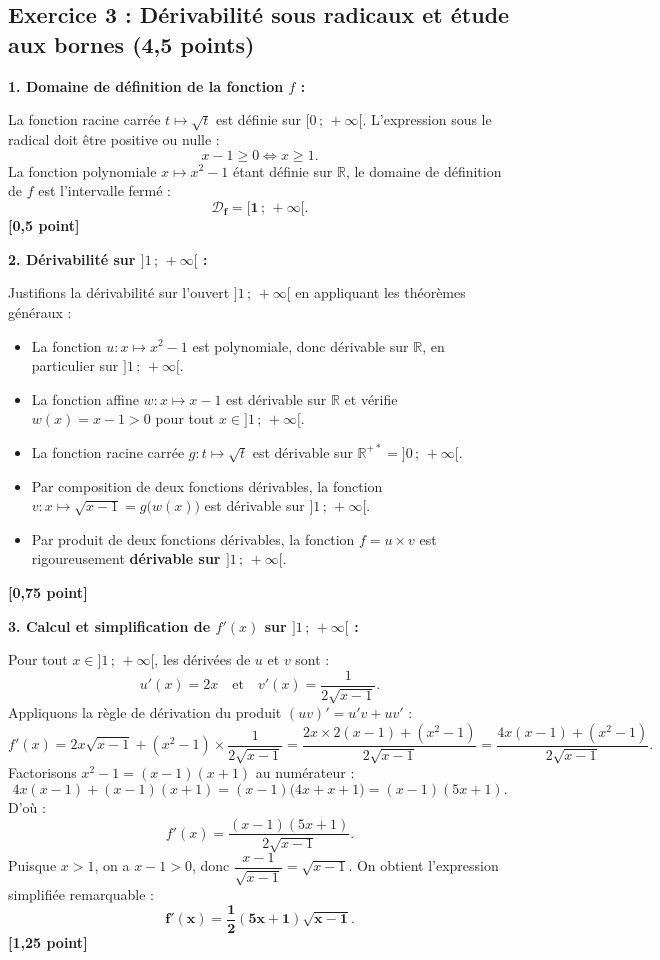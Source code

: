 \documentclass[11pt,a4paper]{article}
\newcommand{\R}{\mathbb{R}}
\begin{document}
\vspace{0.4cm}

\subsection*{Exercice 3 : Dérivabilité sous radicaux et étude aux bornes \hfill \normalfont\normalsize (4{,}5 points)}

\begin{correctionbox}
\textbf{1. Domaine de définition de la fonction $f$ :}

La fonction racine carrée $t \mapsto \sqrt{t}$ est définie sur $[0\,;\,+\infty[$. L'expression sous le radical doit être positive ou nulle :
\[
x - 1 \ge 0 \iff x \ge 1.
\]
La fonction polynomiale $x \mapsto x^2 - 1$ étant définie sur $\R$, le domaine de définition de $f$ est l'intervalle fermé :
\[
\mathbf{\mathcal{D}_f = [1\,;\,+\infty[}.
\] \hfill \textbf{[0{,}5 point]}

\medskip
\textbf{2. Dérivabilité sur $]1\,;\,+\infty[$ :}

Justifions la dérivabilité sur l'ouvert $]1\,;\,+\infty[$ en appliquant les théorèmes généraux :
\begin{itemize}[leftmargin=*]
    \item La fonction $u : x \mapsto x^2 - 1$ est polynomiale, donc dérivable sur $\R$, en particulier sur $]1\,;\,+\infty[$.
    \item La fonction affine $w : x \mapsto x - 1$ est dérivable sur $\R$ et vérifie $w(x) = x - 1 > 0$ pour tout $x \in ]1\,;\,+\infty[$.
    \item La fonction racine carrée $g : t \mapsto \sqrt{t}$ est dérivable sur $\R^{+*} = ]0\,;\,+\infty[$.
    \item Par composition de deux fonctions dérivables, la fonction $v : x \mapsto \sqrt{x - 1} = g\bigl(w(x)\bigr)$ est dérivable sur $]1\,;\,+\infty[$.
    \item Par produit de deux fonctions dérivables, la fonction $f = u \times v$ est rigoureusement \textbf{dérivable sur $]1\,;\,+\infty[$}.
\end{itemize} \hfill \textbf{[0{,}75 point]}

\medskip
\textbf{3. Calcul et simplification de $f'(x)$ sur $]1\,;\,+\infty[$ :}

Pour tout $x \in ]1\,;\,+\infty[$, les dérivées de $u$ et $v$ sont :
\[
u'(x) = 2x \quad \text{et} \quad v'(x) = \frac{1}{2\sqrt{x - 1}}.
\]
Appliquons la règle de dérivation du produit $(uv)' = u'v + uv'$ :
\[
f'(x) = 2x\sqrt{x - 1} + (x^2 - 1) \times \frac{1}{2\sqrt{x - 1}} = \frac{2x \times 2(x - 1) + (x^2 - 1)}{2\sqrt{x - 1}} = \frac{4x(x - 1) + (x^2 - 1)}{2\sqrt{x - 1}}.
\]
Factorisons $x^2 - 1 = (x - 1)(x + 1)$ au numérateur :
\[
4x(x - 1) + (x - 1)(x + 1) = (x - 1)\bigl(4x + x + 1\bigr) = (x - 1)(5x + 1).
\]
D'où :
\[
f'(x) = \frac{(x - 1)(5x + 1)}{2\sqrt{x - 1}}.
\]
Puisque $x > 1$, on a $x - 1 > 0$, donc $\dfrac{x - 1}{\sqrt{x - 1}} = \sqrt{x - 1}$. On obtient l'expression simplifiée remarquable :
\[
\mathbf{f'(x) = \frac{1}{2}(5x + 1)\sqrt{x - 1}}.
\] \hfill \textbf{[1{,}25 point]}


\end{correctionbox}
\end{document}
